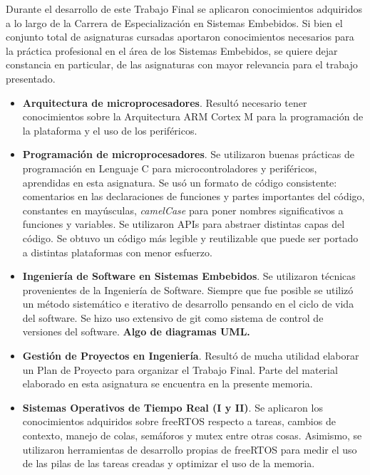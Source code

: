 \medskip

Durante el desarrollo de este Trabajo Final se aplicaron conocimientos adquiridos a lo largo de la Carrera de Especialización en Sistemas Embebidos.  Si bien el conjunto total de asignaturas cursadas  aportaron conocimientos necesarios para la práctica profesional en el área de los Sistemas Embebidos, se quiere dejar constancia en particular, de las asignaturas con mayor relevancia para el trabajo presentado.

\begin{itemize}
\item
\textbf{Arquitectura de microprocesadores}. Resultó necesario tener conocimientos sobre la Arquitectura ARM Cortex M para la programación de la plataforma  y el uso de los periféricos.

\item
\textbf{Programación de microprocesadores}. Se utilizaron buenas prácticas de programación en Lenguaje C para microcontroladores y periféricos, aprendidas en esta asignatura. Se usó un formato de código consistente: comentarios en las declaraciones de funciones y partes importantes del código, constantes en mayúsculas, \textit{camelCase} para poner nombres significativos a funciones y variables. Se utilizaron APIs para abstraer distintas capas del código. Se obtuvo un código más legible y reutilizable que puede ser portado a distintas plataformas con menor esfuerzo.

\item
\textbf{Ingeniería de Software en Sistemas Embebidos}. Se utilizaron técnicas provenientes de la Ingeniería de Software. Siempre que fue posible se utilizó un método sistemático e iterativo de desarrollo pensando en el ciclo de vida del software. Se hizo uso extensivo de git como sistema de control de versiones del software.  \textbf{Algo de diagramas UML.}

\item
\textbf{Gestión de Proyectos en Ingeniería}. Resultó de mucha utilidad elaborar un Plan de Proyecto para organizar el Trabajo Final.  Parte del material elaborado en esta asignatura se encuentra en la presente memoria.

\item
\textbf{Sistemas Operativos de Tiempo Real (I y II)}. Se aplicaron los conocimientos adquiridos sobre freeRTOS respecto a tareas, cambios de contexto, manejo de colas, semáforos y mutex entre otras cosas.  Asimismo, se utilizaron herramientas de desarrollo propias de freeRTOS para medir el uso de las pilas de las tareas creadas y optimizar el uso de la memoria.


\end{itemize}

